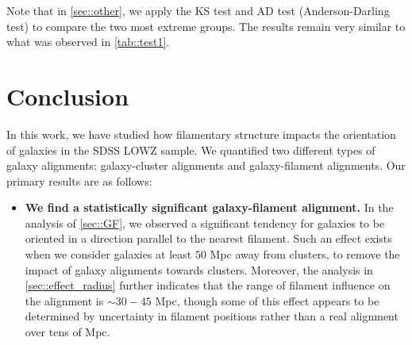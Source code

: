 \documentclass[usenatbib,useAMS]{mnras}
\theoremstyle{remark}
\newcommand{\jab}[1]{{\textcolor{red}{JAB: #1}}}
\begin{document}
{{%

{{Note that in \autoref{sec::other}, we apply the KS test and AD test (Anderson-Darling test)
to compare the two most extreme groups. 
The results remain very similar to what was observed in \autoref{tab::test1}. }

\section{Conclusion}	\label{sec::conc}

In this work, we have studied how filamentary structure impacts the orientation of galaxies in the
SDSS LOWZ sample.  We quantified two different types of galaxy alignments:
galaxy-cluster alignments and galaxy-filament alignments. 
Our primary results are as follows:
\begin{itemize}
\item {\bf We find a statistically significant galaxy-filament alignment.}
In the analysis of \autoref{sec::GF}, we observed a significant tendency for galaxies to be oriented
in a direction parallel to the nearest filament. 
Such an effect exists when we consider galaxies at least $50$ Mpc away from clusters, to remove the
impact of galaxy alignments towards clusters. 
Moreover, the analysis in \autoref{sec::effect_radius} further indicates
that the range of filament influence on the alignment is $\sim30-45$ Mpc, though some of this effect
appears to be determined by uncertainty in filament positions rather than a real alignment over tens
of Mpc. 


\end{itemize}}}}
\end{document}
